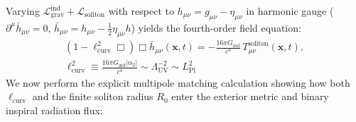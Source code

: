\documentclass[10pt,aps,prd,twocolumn,superscriptaddress,nofootinbib,floatfix,longbibliography,showkeys]{revtex4-2}
\begin{document}
Varying $\mathcal{L}_{\text{grav}}^{\text{ind}} + \mathcal{L}_{\text{soliton}}$ with respect to $h_{\mu\nu} = g_{\mu\nu} - \eta_{\mu\nu}$ in harmonic gauge ($\partial^\mu \bar{h}_{\mu\nu} = 0$, $\bar{h}_{\mu\nu} = h_{\mu\nu} - \frac{1}{2}\eta_{\mu\nu}h$) yields the fourth-order field equation:
\begin{equation}\begin{gathered}
\left(1 - \ell_{\text{curv}}^2 \Box\right)\Box \bar{h}_{\mu\nu}(\mathbf{x}, t) = -\frac{16\pi G_{\text{ind}}}{c^4}\,T_{\mu\nu}^{\text{soliton}}(\mathbf{x}, t), \\
\ell_{\text{curv}}^2 \equiv \frac{16\pi G_{\text{ind}} |\alpha_2|}{c^4} \sim \Lambda_{\text{UV}}^{-2} \sim L_{\text{Pl}}^2
\end{gathered}\end{equation}
We now perform the explicit multipole matching calculation showing how both $\ell_{\text{curv}}$ and the finite soliton radius $R_0$ enter the exterior metric and binary inspiral radiation flux:
\end{document}
